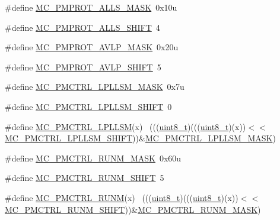\begin{DoxyCompactItemize}
\item 
\#define \hyperlink{group___m_c___register___masks_ga23ca238ebf23d93ec3b2db623ec98685}{M\+C\+\_\+\+P\+M\+P\+R\+O\+T\+\_\+\+A\+L\+L\+S\+\_\+\+M\+A\+SK}~0x10u
\item 
\#define \hyperlink{group___m_c___register___masks_ga63be65fe9d126f5b7a4588d50046f15d}{M\+C\+\_\+\+P\+M\+P\+R\+O\+T\+\_\+\+A\+L\+L\+S\+\_\+\+S\+H\+I\+FT}~4
\item 
\#define \hyperlink{group___m_c___register___masks_gacbb3285ad01804a6750da9ae4e54cc5a}{M\+C\+\_\+\+P\+M\+P\+R\+O\+T\+\_\+\+A\+V\+L\+P\+\_\+\+M\+A\+SK}~0x20u
\item 
\#define \hyperlink{group___m_c___register___masks_gad47b6985017afedb6de121fa7ff202f3}{M\+C\+\_\+\+P\+M\+P\+R\+O\+T\+\_\+\+A\+V\+L\+P\+\_\+\+S\+H\+I\+FT}~5
\item 
\#define \hyperlink{group___m_c___register___masks_gaeed24ea6d5e9f9a1517c1e8f7da7fab9}{M\+C\+\_\+\+P\+M\+C\+T\+R\+L\+\_\+\+L\+P\+L\+L\+S\+M\+\_\+\+M\+A\+SK}~0x7u
\item 
\#define \hyperlink{group___m_c___register___masks_gaa57200fba1c08d70059c2c2f2549f416}{M\+C\+\_\+\+P\+M\+C\+T\+R\+L\+\_\+\+L\+P\+L\+L\+S\+M\+\_\+\+S\+H\+I\+FT}~0
\item 
\#define \hyperlink{group___m_c___register___masks_ga4fb315b0ebacb11c6eea513f4dfb26f0}{M\+C\+\_\+\+P\+M\+C\+T\+R\+L\+\_\+\+L\+P\+L\+L\+SM}(x)                                        ~(((\hyperlink{_p_e___types_8h_aba7bc1797add20fe3efdf37ced1182c5}{uint8\+\_\+t})(((\hyperlink{_p_e___types_8h_aba7bc1797add20fe3efdf37ced1182c5}{uint8\+\_\+t})(x))$<$$<$\hyperlink{group___m_c___register___masks_gaa57200fba1c08d70059c2c2f2549f416}{M\+C\+\_\+\+P\+M\+C\+T\+R\+L\+\_\+\+L\+P\+L\+L\+S\+M\+\_\+\+S\+H\+I\+FT}))\&\hyperlink{group___m_c___register___masks_gaeed24ea6d5e9f9a1517c1e8f7da7fab9}{M\+C\+\_\+\+P\+M\+C\+T\+R\+L\+\_\+\+L\+P\+L\+L\+S\+M\+\_\+\+M\+A\+SK})
\item 
\#define \hyperlink{group___m_c___register___masks_ga26d9f59eaf18fbaedc6a295ac1e54ca0}{M\+C\+\_\+\+P\+M\+C\+T\+R\+L\+\_\+\+R\+U\+N\+M\+\_\+\+M\+A\+SK}~0x60u
\item 
\#define \hyperlink{group___m_c___register___masks_gac4f11a25b9713f3a10ab70a6b33ace00}{M\+C\+\_\+\+P\+M\+C\+T\+R\+L\+\_\+\+R\+U\+N\+M\+\_\+\+S\+H\+I\+FT}~5
\item 
\#define \hyperlink{group___m_c___register___masks_ga4b6c8f890440f6137dc9e20f5e52563b}{M\+C\+\_\+\+P\+M\+C\+T\+R\+L\+\_\+\+R\+U\+NM}(x)                                            ~(((\hyperlink{_p_e___types_8h_aba7bc1797add20fe3efdf37ced1182c5}{uint8\+\_\+t})(((\hyperlink{_p_e___types_8h_aba7bc1797add20fe3efdf37ced1182c5}{uint8\+\_\+t})(x))$<$$<$\hyperlink{group___m_c___register___masks_gac4f11a25b9713f3a10ab70a6b33ace00}{M\+C\+\_\+\+P\+M\+C\+T\+R\+L\+\_\+\+R\+U\+N\+M\+\_\+\+S\+H\+I\+FT}))\&\hyperlink{group___m_c___register___masks_ga26d9f59eaf18fbaedc6a295ac1e54ca0}{M\+C\+\_\+\+P\+M\+C\+T\+R\+L\+\_\+\+R\+U\+N\+M\+\_\+\+M\+A\+SK})

\end{DoxyCompactItemize}
